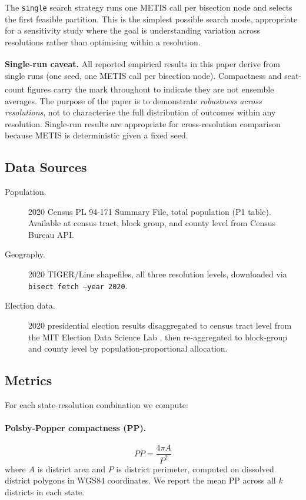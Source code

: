 The \texttt{single} search strategy runs one METIS call per bisection node
and selects the first feasible partition.  This is the simplest possible
search mode, appropriate for a sensitivity study where the goal is
understanding variation across resolutions rather than optimising within a
resolution.

\textbf{Single-run caveat.}\textsuperscript{\dag}  All reported empirical
results in this paper derive from single runs (one seed, one METIS call per
bisection node).  Compactness and seat-count figures carry the
\textsuperscript{\dag} mark throughout to indicate they are not ensemble
averages.  The purpose of the paper is to demonstrate \emph{robustness across
resolutions}, not to characterise the full distribution of outcomes within
any resolution.  Single-run results are appropriate for cross-resolution
comparison because METIS is deterministic given a fixed seed.

\subsection{Data Sources}

\begin{description}
  \item[Population.] 2020 Census PL 94-171 Summary File, total population
    (P1 table).  Available at census tract, block group, and county level
    from Census Bureau API.
  \item[Geography.] 2020 TIGER/Line shapefiles, all three resolution levels,
    downloaded via \texttt{bisect fetch --year 2020}.
  \item[Election data.] 2020 presidential election results disaggregated to
    census tract level from the MIT Election Data Science Lab
    \citep{MEDSL2020}, then re-aggregated to block-group and county level
    by population-proportional allocation.
\end{description}

\subsection{Metrics}

For each state-resolution combination we compute:

\paragraph{Polsby-Popper compactness (PP).}
\begin{equation}
  PP = \frac{4\pi A}{P^2}
\end{equation}
where $A$ is district area and $P$ is district perimeter, computed on
dissolved district polygons in WGS84 coordinates.  We report the mean PP
across all $k$ districts in each state.

